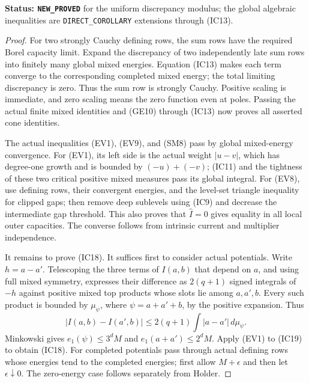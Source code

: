\documentclass[11pt,a4paper]{article}
\numberwithin{equation}{section}
\theoremstyle{definition}
\theoremstyle{remark}
\begin{document}
\noindent\textbf{Status: \texttt{NEW\_PROVED}} for the uniform
discrepancy modulus; the global algebraic inequalities are
\texttt{DIRECT\_COROLLARY} extensions through (IC13).

\begin{proof}
For two strongly Cauchy defining rows, the sum rows have the
required Borel capacity limit. Expand the discrepancy of two
independently late sum rows into finitely many global mixed
energies. Equation (IC13) makes each term converge to the
corresponding completed mixed energy; the total limiting
discrepancy is zero. Thus the sum row is strongly Cauchy.
Positive scaling is immediate, and zero scaling means the
zero function even at poles. Passing the actual finite mixed
identities and (GE10) through (IC13) now proves all asserted
cone identities.

The actual inequalities (EV1), (EV9), and (SM8) pass by
global mixed-energy convergence. For (EV1), its left side is
the actual weight $|u-v|$, which has degree-one growth and is
bounded by $(-u)+(-v)$; (IC11) and the tightness of these two
critical positive mixed measures pass its global integral.
For (EV8), use defining rows, their convergent energies,
and the level-set triangle inequality for clipped gaps;
then remove deep sublevels using (IC9) and decrease the
intermediate gap threshold. This also proves that
$\widehat I=0$ gives equality in all local outer capacities.
The converse follows from intrinsic current and multiplier
independence.

It remains to prove (IC18). It suffices first to consider
actual potentials. Write $h=a-a'$. Telescoping the three
terms of $I(a,b)$ that depend on $a$, and using full mixed
symmetry, expresses their difference as $2(q+1)$ signed
integrals of $-h$ against positive mixed top products whose
slots lie among $a,a',b$. Every such product is bounded by
$\mu_\psi$, where $\psi=a+a'+b$, by the positive expansion.
Thus
\[
 |I(a,b)-I(a',b)|
                  \leq2(q+1)\int|a-a'|\,d\mu_\psi.
 \tag{IC19}
\]
Minkowski gives $e_1(\psi)\leq3^dM$ and
$e_1(a+a')\leq2^dM$. Apply (EV1) to (IC19) to obtain
(IC18). For completed potentials pass through actual
defining rows whose energies tend to the completed energies;
first allow $M+\epsilon$ and then let $\epsilon\downarrow0$.
The zero-energy case follows separately from Holder.
\end{proof}
\end{document}
